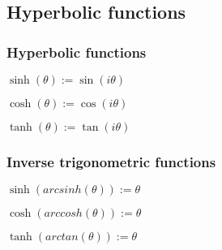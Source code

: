 
\subsection{Hyperbolic functions}

\subsubsection{Hyperbolic functions}

\(\sinh(\theta ):=\sin(i\theta )\)

\(\cosh(\theta ):=\cos(i\theta )\)

\(\tanh(\theta ):=\tan(i\theta )\)

\subsubsection{Inverse trigonometric functions}

\(\sinh (arcsinh (\theta )):=\theta \)

\(\cosh (arccosh (\theta )):=\theta \)

\(\tanh (arctan (\theta )):=\theta \)

